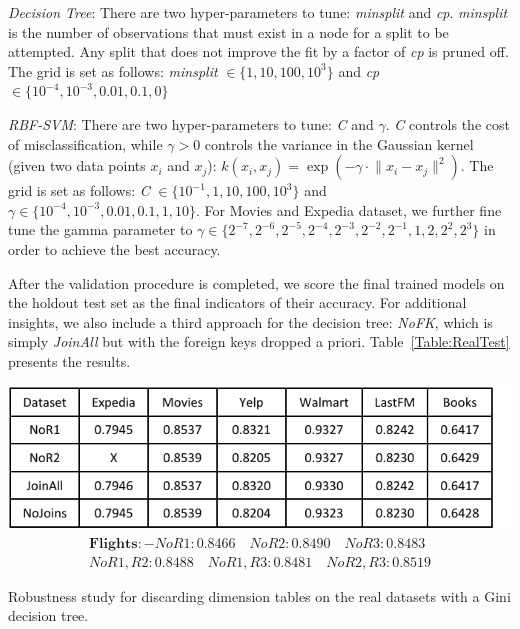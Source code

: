 \documentclass[sigconf]{acmart}
\begin{document}
\textit{Decision Tree}: There are two hyper-parameters to tune: \textit{minsplit} and \textit{cp}. \textit{minsplit} is the number of observations that 
must exist in a node for a split to be attempted. Any split that does not improve the fit by a factor of \textit{cp} is pruned off. 
The grid is set as follows: \textit{minsplit} $\in \{ 1, 10, 100, 10^3\}$ and \textit{cp} $\in \{10^{-4}, 10^{-3}, 0.01, 0.1, 0\}$   

\textit{RBF-SVM}: There are two hyper-parameters to tune: \textit{C} and $\gamma$. \textit{C} controls the cost of misclassification, while $\gamma > 0$ controls the variance in 
the Gaussian kernel (given two data points $x_i$ and $x_j$): $k(x_i,x_j) = \exp(-\gamma \cdot \lVert{x_i - x_j} \rVert ^2 )$.
The grid is set as follows: \textit{C} $\in \{10^{-1}, 1, 10, 100, 10^3\}$ and $\gamma \in \{10^{-4}, 10^{-3}, 0.01, 0.1, 1, 10\}$. For Movies and Expedia dataset, we further fine tune the gamma parameter to $\gamma \in \{2^{-7}, 2^{-6},2^{-5}, 2^{-4}, 2^{-3}, 2^{-2},2^{-1}, 1,2, 2^{2}, 2^{3}\}$ in order to achieve the best accuracy.

After the validation procedure is completed, we score the final trained models on the holdout test set as the final indicators of their accuracy. 
For additional insights, we also include a third approach for the decision tree: \textit{NoFK}, which is simply \textit{JoinAll} but with the foreign keys dropped a priori.
Table~\ref{Table:RealTest} presents the results.

\begin{table}[t]
\centering
\includegraphics[width=\columnwidth,height=\textheight,keepaspectratio]{table4.pdf}
\begin{align*}
\textbf{Flights} :- NoR1: 0.8466 \quad NoR2: 0.8490 \quad NoR3: 0.8483 \\
No R1,R2: 0.8488 \quad No R1,R3: 0.8481 \quad No R2,R3: 0.8519
\end{align*}
\caption{Robustness study for discarding dimension tables on the real datasets with a Gini decision tree.}
\label{Table:robustness}
\vspace{-4mm}
\end{table}
\end{document}
